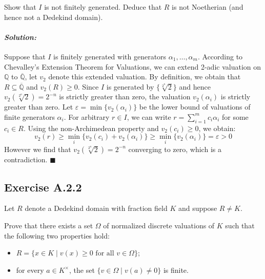 \documentclass[12pt, a4paper]{article}
\newenvironment{solution}
  {\paragraph{\textit{Solution:}}\par\medskip}
  {\hfill$\blacksquare$\vspace{0.1cm}}
\begin{document}
Show that $I$ is not finitely generated. Deduce that $R$ is not Noetherian (and hence not a Dedekind domain).

\begin{solution}
    Suppose that $I$ is finitely generated with generators $\alpha_1,\dots,\alpha_m$.
    According to Chevalley's Extension Theorem for Valuations, we can extend 2-adic valuation on $\mathbb{Q}$ to $\overline{\mathbb{Q}}$, let $v_2$ denote this extended valuation.
    By definition, we obtain that $R\subseteq \overline{\mathbb{Q}}$ and $v_2(R)\ge 0$.
    Since $I$ is generated by $\{\sqrt[2^n]{2} \}$ and hence $v_2(\sqrt[2^n]{2})= 2^{-n}$ is strictly greater than zero, the valuation $v_2(\alpha_i)$ is strictly greater than zero.
    Let $\varepsilon = \min\{v_{2}(\alpha_i)\}$ be the lower bound of valuations of finite generators $\alpha_i$.
    For arbitrary $r \in I$, we can write $r = \sum_{i=1}^m c_i \alpha_i$ for some $c_i \in R$. Using the non-Archimedean property and $v_2(c_i) \ge 0$, we obtain:$$v_2(r) \ge \min_{i} \{v_2(c_i) + v_2(\alpha_i)\} \ge \min_{i} \{v_2(\alpha_i)\} = \varepsilon > 0$$
    However we find that $v_{2}(\sqrt[2^n]{2}) = 2^{-n}$ converging to zero, which is a contradiction.
\end{solution}
\subsection*{Exercise A.2.2}
Let $R$ denote a Dedekind domain with fraction field $K$ and suppose $R \neq K$. 

Prove that there exists a set $\Omega$ of normalized discrete valuations of $K$ such that the following two properties hold:
\begin{itemize}
    \item[(R1)] $R = \{x \in K \mid v(x) \geq 0 \text{ for all } v \in \Omega\}$;
    \item[(R2)] for every $a \in K^\times$, the set $\{v \in \Omega \mid v(a) \neq 0\}$ is finite.
\end{itemize}
\end{document}
